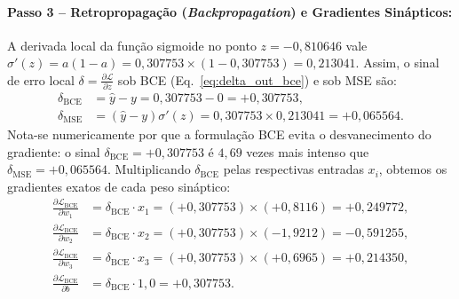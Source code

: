 \documentclass[runningheads]{llncs}
\begin{document}
\paragraph{Passo 3 -- Retropropaga\c{c}\~{a}o (\textit{Backpropagation}) e Gradientes Sin\'{a}pticos:}
A derivada local da fun\c{c}\~{a}o sigmoide no ponto $z = -0{,}810646$ vale $\sigma'(z) = a(1 - a) = 0{,}307753 \times (1 - 0{,}307753) = 0{,}213041$. Assim, o sinal de erro local $\delta = \frac{\partial \mathcal{L}}{\partial z}$ sob BCE (Eq.~\eqref{eq:delta_out_bce}) e sob MSE s\~{a}o:
\begin{align}
    \delta_{\text{BCE}} &= \hat{y} - y = 0{,}307753 - 0 = +0{,}307753, \nonumber\\
    \delta_{\text{MSE}} &= (\hat{y} - y)\sigma'(z) = 0{,}307753 \times 0{,}213041 = +0{,}065564.
\end{align}
Nota-se numericamente por que a formula\c{c}\~{a}o BCE evita o desvanecimento do gradiente: o sinal $\delta_{\text{BCE}} = +0{,}307753$ \'{e} $4{,}69$ vezes mais intenso que $\delta_{\text{MSE}} = +0{,}065564$. Multiplicando $\delta_{\text{BCE}}$ pelas respectivas entradas $x_i$, obtemos os gradientes exatos de cada peso sin\'{a}ptico:
\begin{align}
    \frac{\partial \mathcal{L}_{\text{BCE}}}{\partial w_1} &= \delta_{\text{BCE}} \cdot x_1 = (+0{,}307753) \times (+0{,}8116) = +0{,}249772, \nonumber\\
    \frac{\partial \mathcal{L}_{\text{BCE}}}{\partial w_2} &= \delta_{\text{BCE}} \cdot x_2 = (+0{,}307753) \times (-1{,}9212) = -0{,}591255, \nonumber\\
    \frac{\partial \mathcal{L}_{\text{BCE}}}{\partial w_3} &= \delta_{\text{BCE}} \cdot x_3 = (+0{,}307753) \times (+0{,}6965) = +0{,}214350, \nonumber\\
    \frac{\partial \mathcal{L}_{\text{BCE}}}{\partial b} &= \delta_{\text{BCE}} \cdot 1{,}0 = +0{,}307753.
\end{align}
\end{document}
